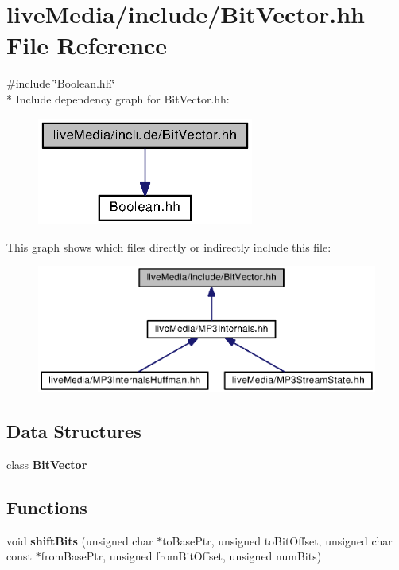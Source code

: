 \section{live\+Media/include/\+Bit\+Vector.hh File Reference}
\label{BitVector_8hh}
{\ttfamily \#include \char`\"{}Boolean.\+hh\char`\"{}}\\*
Include dependency graph for Bit\+Vector.\+hh\+:
\nopagebreak
\begin{figure}[H]
\begin{center}
\leavevmode
\includegraphics[width=202pt]{BitVector_8hh__incl}
\end{center}
\end{figure}
This graph shows which files directly or indirectly include this file\+:
\nopagebreak
\begin{figure}[H]
\begin{center}
\leavevmode
\includegraphics[width=350pt]{BitVector_8hh__dep__incl}
\end{center}
\end{figure}
\subsection*{Data Structures}
\begin{DoxyCompactItemize}
\item 
class {\bf Bit\+Vector}
\end{DoxyCompactItemize}
\subsection*{Functions}
\begin{DoxyCompactItemize}
\item 
void {\bf shift\+Bits} (unsigned char $\ast$to\+Base\+Ptr, unsigned to\+Bit\+Offset, unsigned char const $\ast$from\+Base\+Ptr, unsigned from\+Bit\+Offset, unsigned num\+Bits)
\end{DoxyCompactItemize}


